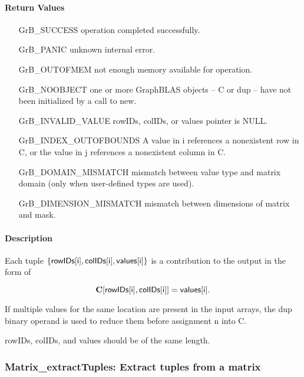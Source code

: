 \paragraph{Return Values}

\begin{itemize}[leftmargin=2.1in]
\item[{\sf GrB\_SUCCESS}]      operation completed successfully.
\item[{\sf GrB\_PANIC}]        unknown internal error.
\item[{\sf GrB\_OUTOFMEM}]     not enough memory available for operation.
\item[{\sf GrB\_NOOBJECT}]     one or more GraphBLAS objects -- {\sf C} or  {\sf dup} -- have not been initialized by a call to {\sf new}.
\item[{\sf GrB\_INVALID\_VALUE}]  {\sf rowIDs}, {\sf colIDs}, or {\sf values} pointer is {\sf NULL}.
\item[{\sf GrB\_INDEX\_OUTOFBOUNDS}]
        A value in i references a nonexistent row in C, or
        the value in j references a nonexistent column in C.
\item[\sf GrB\_DOMAIN\_MISMATCH]  
       mismatch between value type and matrix domain (only when user-defined types are used).
\item[\sf GrB\_DIMENSION\_MISMATCH]  
                       mismatch between dimensions of matrix and mask. 
\end{itemize}


\paragraph{Description}
Each tuple $\{ {\sf rowIDs[i]}, {\sf colIDs[i]}, {\sf values[i]}\}$ is a contribution to the output in the form of 

$${\bf C}[{\sf rowIDs[i]}, {\sf colIDs[i]}] = {\sf values[i]}.$$

If multiple values for the same location are present in the input arrays, the 
{\sf dup} binary operand is used to reduce them before assignment n into {\sf C}.
 
{\sf rowIDs}, {\sf colIDs}, and {\sf values} should be of the same length. 


\subsubsection{{\sf Matrix\_extractTuples}: Extract tuples from a matrix}
\label{Sec:Matrix_extractTuples}


